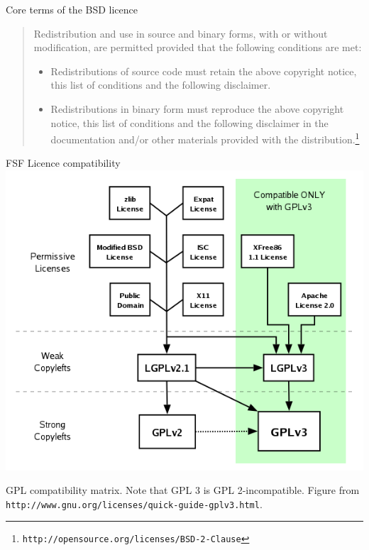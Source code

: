 \documentclass[t]{beamer}
\def\url#1{\texttt{#1}}\fi
\begin{document}
\begin{frame}{Core terms of the BSD licence}
  \begin{quotation}
  Redistribution and use in source and binary forms, with or without
  modification, are permitted provided that the following conditions are
  met:
  \begin{itemize}
  \item Redistributions of source code must retain the above copyright
    notice, this list of conditions and the following disclaimer.
  \item Redistributions in binary form must reproduce the above copyright
    notice, this list of conditions and the following disclaimer in the
    documentation and/or other materials provided with the
    distribution.\footnote{\url{http://opensource.org/licenses/BSD-2-Clause}}
  \end{itemize}
\end{quotation}
\end{frame}

\begin{frame}{FSF Licence compatibility}
  \centering 
  \includegraphics[height=.8\textheight]{compatibility.png}
  
  GPL compatibility matrix. Note that GPL 3 is
    GPL 2-incompatible. Figure from \url{http://www.gnu.org/licenses/quick-guide-gplv3.html}.
\end{frame}
\end{document}
